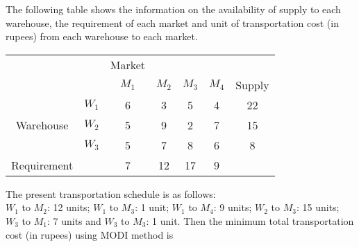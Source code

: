 \documentclass[journal,12pt,twocolumn]{IEEEtran}
\begin{document}
\begin{problem}
The following table shows the information on the availability of supply to each warehouse, the requirement of each market and unit of transportation cost (in rupees) from each warehouse to each market.
\begin{table}[!h]
\centering
\begin{tabular}{c c c c c c c}
& & Market & & & & \\
& & $M_1$ & $M_2$ & $M_3$ & $M_4$ & Supply \\
& $W_1$ & 6 & 3 & 5 & 4 & 22 \\
Warehouse & $W_2$ & 5 & 9 & 2 & 7 & 15 \\
& $W_3$ & 5 & 7 & 8 & 6 & 8 \\
Requirement & & 7 & 12 & 17 & 9 & 
\end{tabular}
\end{table}
\medskip
The present transportation schedule is as follows: \\
$W_1$ to $M_2$: 12 units; $W_1$ to $M_3$: 1 unit; $W_1$ to $M_4$: 9 units; $W_2$ to $M_3$: 15 units; $W_3$ to $M_1$: 7 units and $W_3$ to $M_3$: 1 unit. Then the minimum total transportation cost (in rupees) using MODI method is 
\end{problem}
\end{document}
